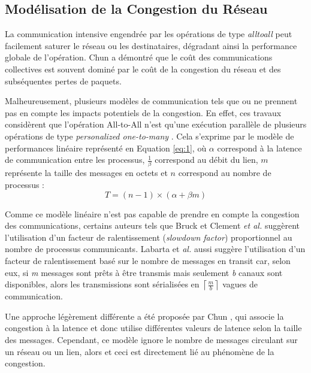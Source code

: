 \subsection{Modélisation de la Congestion du Réseau\label{cluster}}

La communication intensive engendrée par les opérations de type \textit{alltoall} peut facilement saturer le réseau ou les destinataires, dégradant ainsi la performance globale de l'opération. Chun \cite{Chun01} a démontré que le coût des communications collectives est souvent dominé par le coût de la congestion du réseau et des subséquentes pertes de paquets.

Malheureusement, plusieurs modèles de communication tels que \cite{Christara99} ou \cite{Pjesivac-Grbovic05} ne prennent pas en compte les impacts potentiels de la congestion. En effet, ces travaux considèrent que l'opération All-to-All n'est qu'une exécution parallèle de plusieurs opérations de type \emph{personalized one-to-many} \cite{Johnsson89}. Cela s'exprime par le modèle de performances linéaire représenté en Equation \ref{eq:1}, où $\alpha$ correspond à la latence de communication entre les processus, $\frac{1}{\beta}$ correspond au débit du lien, $m$ représente la taille des messages en octets et  $n$ correspond au nombre de processus :
\begin{equation}
T=(n-1)\times(\alpha+\beta m)\label{eq:1}
\end{equation}

Comme ce modèle linéaire n'est pas capable de prendre en compte la congestion des communications, certains auteurs tels que Bruck \cite{Bruck97b} et Clement \emph{et al.} \cite{Clement96} suggèrent l'utilisation d'un facteur de ralentissement (\emph{slowdown factor}) proportionnel au nombre de processus communicants.  Labarta et \emph{al.} \cite{Labarta96} aussi suggère l'utilisation d'un facteur de ralentissement basé sur le nombre de messages en transit car, selon eux, si \emph{m} messages sont prêts à être transmis mais seulement \emph{b} canaux sont disponibles, alors les transmissions sont sérialisées en $\left\lceil \frac{m}{b}\right\rceil $ vagues de communication. 

Une approche légèrement différente a été proposée par Chun \cite{Chun01}, qui associe la congestion à la latence et donc utilise différentes valeurs de latence selon la taille des messages. Cependant, ce modèle ignore le nombre de messages circulant sur un réseau ou un lien, alors et ceci est directement lié au phénomène de la congestion. 

